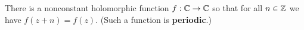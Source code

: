 \documentclass{homework}
\begin{document}
                                                                                                                                                                                                                                                                                        \begin{problem}
                                                                                                                                                                                                                                                                                          There is a nonconstant holomorphic function $f : \mathbb{C} \to \mathbb{C}$ so that
                                                                                                                                                                                                                                                                                            for all $n \in \mathbb{Z}$ we have $f(z + n) = f(z)$.  (Such a function is
                                                                                                                                                                                                                                                                                              \textbf{periodic}.)
                                                                                                                                                                                                                                                                                              \end{problem}
\end{document}
